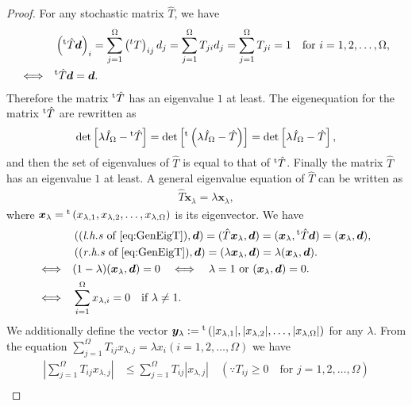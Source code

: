 \begin{proof}
	For any stochastic matrix $\hat{T}$, we have
	\begin{align}
	&\left({}^{\rm t}\hat{T}\bm{d}\right)_{i}=\sum_{j=1}^{\Omega}\left({}^{t}T\right)_{ij}d_{j}=\sum_{j=1}^{\Omega}T_{ji}d_{j}=\sum_{j=1}^{\Omega}T_{ji}=1\quad\text{for $i=1,2,\dots,\Omega$},\\
	\Longleftrightarrow\quad &{}^{\rm t}\hat{T}\bm{d} = \bm{d}.
	\end{align}
	Therefore the matrix ${}^{\rm t}\hat{T}$ has an eigenvalue $1$ at least. The eigenequation for the matrix ${}^{\rm t}\hat{T}$ are rewritten as
	\begin{align}
	\det\left[\lambda \hat{I}_{\Omega} - {}^{\rm t}\hat{T}\right] = \det\left[{}^{\rm t}\left(\lambda \hat{I}_{\Omega} - \hat{T}\right)\right] = \det\left[\lambda \hat{I}_{\Omega} - \hat{T}\right],
	\end{align}
	and then the set of eigenvalues of $\hat{T}$ is equal to that of ${}^{\rm t}\hat{T}$. Finally the matrix $\hat{T}$ has an eigenvalue $1$ at least. A general eigenvalue equation of $\hat{T}$ can be written as
	\begin{align}
	\hat{T}\bm{x}_{\lambda} = \lambda\bm{x}_{\lambda}\label{eq:GenEigT},
	\end{align}
	where $\bm{x}_{\lambda}={}^{\rm t}\left(x_{\lambda,1},x_{\lambda,2},\dots,x_{\lambda,\Omega}\right)$ is its eigenvector. We have
	\begin{align}
	&\left((\text{\textit{l.h.s} of \ref{eq:GenEigT}}),\bm{d}\right) = (\hat{T}\bm{x}_{\lambda},\bm{d}) = (\bm{x}_{\lambda},{}^{\rm t}\hat{T}\bm{d}) = (\bm{x}_{\lambda},\bm{d}),\\
	&\left((\text{\textit{r.h.s} of \ref{eq:GenEigT}}),\bm{d}\right) = (\lambda\bm{x}_{\lambda},\bm{d}) = \lambda(\bm{x}_{\lambda},\bm{d}).\\
	\Longleftrightarrow \quad& (1-\lambda)(\bm{x}_{\lambda},\bm{d}) = 0\quad\Longleftrightarrow \quad \lambda = 1\text{ or }(\bm{x}_{\lambda},\bm{d}) = 0.\\
	\Longleftrightarrow \quad& \sum_{i=1}^{\Omega}x_{\lambda,i} = 0\quad\text{if $\lambda \neq 1$}.
	\end{align}
	We additionally define the vector $\bm{y}_{\lambda}:={}^{\rm t}\left(|x_{\lambda,1}|,|x_{\lambda,2}|,\dots,|x_{\lambda,\Omega}|\right)$ for any $\lambda$. From the equation $\sum_{j=1}^{\Omega}T_{ij}x_{\lambda,j}=\lambda x_{i}(i=1,2,\dots,\Omega)$ we have
	\begin{align}
	|\sum_{j=1}^{\Omega}T_{ij}x_{\lambda,j}| &\leq \sum_{j=1}^{\Omega}T_{ij}|x_{\lambda,j}|\quad(\because T_{ij}\geq 0\quad\text{for $j=1,2,\dots,\Omega$})\\

\end{align}
\end{proof}
